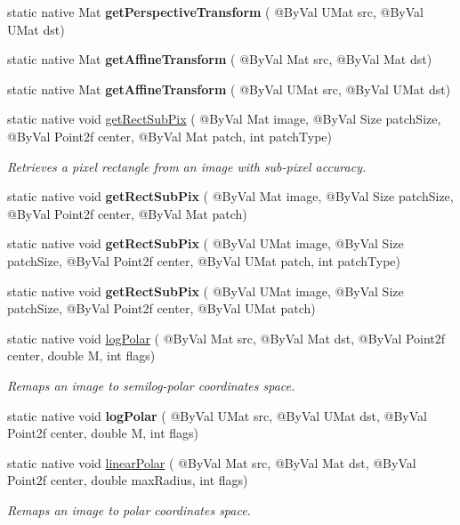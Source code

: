 \begin{DoxyCompactItemize}
static native Mat {\bfseries get\+Perspective\+Transform} ( @By\+Val U\+Mat src, @By\+Val U\+Mat dst)
\item 
static native Mat {\bfseries get\+Affine\+Transform} ( @By\+Val Mat src, @By\+Val Mat dst)
\item 
static native Mat {\bfseries get\+Affine\+Transform} ( @By\+Val U\+Mat src, @By\+Val U\+Mat dst)
\item 
static native void \hyperlink{group__imgproc__transform_gae176a226575415412c0b6ea67126e54e}{get\+Rect\+Sub\+Pix} ( @By\+Val Mat image, @By\+Val Size patch\+Size, @By\+Val Point2f center, @By\+Val Mat patch, int patch\+Type)
\begin{DoxyCompactList}\small\item\em Retrieves a pixel rectangle from an image with sub-\/pixel accuracy. \end{DoxyCompactList}\item 
static native void {\bfseries get\+Rect\+Sub\+Pix} ( @By\+Val Mat image, @By\+Val Size patch\+Size, @By\+Val Point2f center, @By\+Val Mat patch)
\item 
static native void {\bfseries get\+Rect\+Sub\+Pix} ( @By\+Val U\+Mat image, @By\+Val Size patch\+Size, @By\+Val Point2f center, @By\+Val U\+Mat patch, int patch\+Type)
\item 
static native void {\bfseries get\+Rect\+Sub\+Pix} ( @By\+Val U\+Mat image, @By\+Val Size patch\+Size, @By\+Val Point2f center, @By\+Val U\+Mat patch)
\item 
static native void \hyperlink{group__imgproc__transform_ga525e11d8b35ba086ca22b5ea9307c6a7}{log\+Polar} ( @By\+Val Mat src, @By\+Val Mat dst, @By\+Val Point2f center, double M, int flags)
\begin{DoxyCompactList}\small\item\em Remaps an image to semilog-\/polar coordinates space. \end{DoxyCompactList}\item 
static native void {\bfseries log\+Polar} ( @By\+Val U\+Mat src, @By\+Val U\+Mat dst, @By\+Val Point2f center, double M, int flags)
\item 
static native void \hyperlink{group__imgproc__transform_ga46939c6aff509b593336b89237a563d3}{linear\+Polar} ( @By\+Val Mat src, @By\+Val Mat dst, @By\+Val Point2f center, double max\+Radius, int flags)
\begin{DoxyCompactList}\small\item\em Remaps an image to polar coordinates space. \end{DoxyCompactList}\item 

\end{DoxyCompactItemize}
